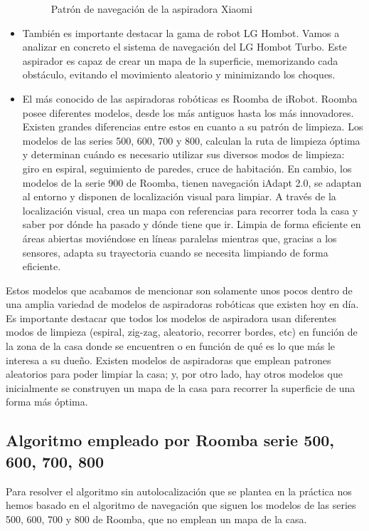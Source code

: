 \begin{itemize}
\begin{figure}[H]
\begin{center}
		\caption{Patrón de navegación de la aspiradora Xiaomi}
		\label{fig.Xiaomi}
		\end{center}
\end{figure}
\item También es importante destacar la gama de robot LG Hombot. Vamos a analizar en concreto el sistema de navegación del LG Hombot Turbo. Este aspirador es capaz de crear un mapa de la superficie, memorizando cada obstáculo, evitando el movimiento aleatorio y minimizando los choques. 
\item El más conocido de las aspiradoras robóticas es Roomba de iRobot. Roomba posee diferentes modelos, desde los más antiguos hasta los más innovadores. Existen grandes diferencias entre estos en cuanto a su patrón de limpieza. Los modelos de las series 500, 600, 700 y 800, calculan la ruta de limpieza óptima y determinan cuándo es necesario utilizar sus diversos modos de limpieza: giro en espiral, seguimiento de paredes, cruce de habitación. En cambio, los modelos de la serie 900 de Roomba, tienen navegación iAdapt 2.0, se adaptan al entorno y disponen de localización visual para limpiar. A través de la localización visual, crea un mapa con referencias para recorrer toda la casa y saber por dónde ha pasado y dónde tiene que ir. Limpia de forma eficiente en áreas abiertas moviéndose en líneas paralelas mientras que, gracias a los sensores, adapta su trayectoria cuando se necesita limpiando de forma eficiente.
\end{itemize}

Estos modelos que acabamos de mencionar son solamente unos pocos dentro de una amplia variedad de modelos de aspiradoras robóticas que existen hoy en día. Es importante destacar que todos los modelos de aspiradora usan diferentes modos de limpieza (espiral, zig-zag, aleatorio, recorrer bordes, etc) en función de la zona de la casa donde se encuentren o en función de qué es lo que más le interesa a su dueño. Existen modelos de aspiradoras que emplean patrones aleatorios para poder limpiar la casa; y, por otro lado, hay otros modelos que inicialmente se construyen un mapa de la casa para recorrer la superficie de una forma más óptima.

\subsection{Algoritmo empleado por Roomba serie 500, 600, 700, 800}
Para resolver el algoritmo sin autolocalización que se plantea en la práctica nos hemos basado en el algoritmo de navegación que siguen los modelos de las series 500, 600, 700 y 800 de Roomba, que no emplean un mapa de la casa.\\

